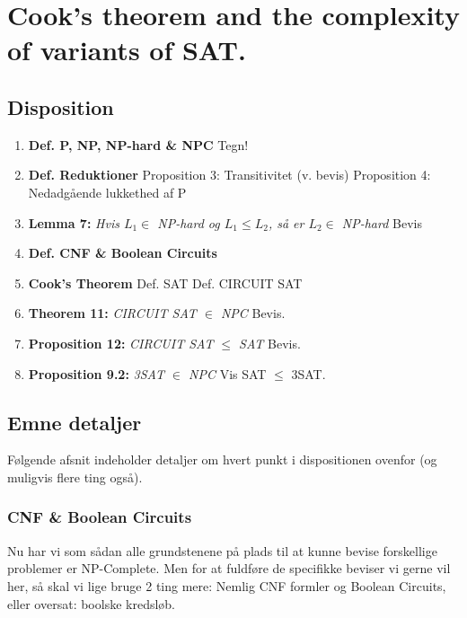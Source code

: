 \section{Cook's theorem and the complexity of variants of SAT.}

\subsection{Disposition}

\begin{enumerate}
 \item \textbf{Def. P, NP, NP-hard \& NPC}
    \subitem  Tegn!
 \item \textbf{Def. Reduktioner}
    \subitem  Proposition 3: Transitivitet (v. bevis)
    \subitem  Proposition 4: Nedadgående lukkethed af P
 \item \textbf{Lemma 7:} \textit{Hvis $L_1 \in$ NP-hard og $L_1 \leq L_2$, så er $L_2 \in$ NP-hard}
    \subitem  Bevis
 \item \textbf{Def. CNF \& Boolean Circuits}
 \item \textbf{Cook's Theorem}
    \subitem Def. SAT
    \subitem Def. CIRCUIT SAT
 \item \textbf{Theorem 11:} \textit{CIRCUIT SAT $\in$ NPC}
    \subitem Bevis.
 \item \textbf{Proposition 12:} \textit{CIRCUIT SAT $\leq$ SAT}
    \subitem Bevis.
 \item \textbf{Proposition 9.2:} \textit{3SAT $\in$ NPC}
    \subitem Vis SAT $\leq$ 3SAT.
\end{enumerate}

\subsection{Emne detaljer}

Følgende afsnit indeholder detaljer om hvert punkt i dispositionen ovenfor (og
muligvis flere ting også).







\subsubsection{CNF \& Boolean Circuits}

Nu har vi som sådan alle grundstenene på plads til at kunne bevise forskellige
problemer er NP-Complete. Men for at fuldføre de specifikke beviser vi gerne
vil her, så skal vi lige bruge 2 ting mere: Nemlig CNF formler og Boolean
Circuits, eller oversat: boolske kredsløb.\\

